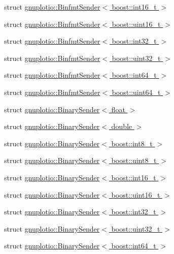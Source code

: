 \begin{DoxyCompactItemize}
struct \hyperlink{structgnuplotio_1_1_binfmt_sender_3_01boost_1_1int16__t_01_4}{gnuplotio\+::\+Binfmt\+Sender$<$ boost\+::int16\+\_\+t $>$}
\item 
struct \hyperlink{structgnuplotio_1_1_binfmt_sender_3_01boost_1_1uint16__t_01_4}{gnuplotio\+::\+Binfmt\+Sender$<$ boost\+::uint16\+\_\+t $>$}
\item 
struct \hyperlink{structgnuplotio_1_1_binfmt_sender_3_01boost_1_1int32__t_01_4}{gnuplotio\+::\+Binfmt\+Sender$<$ boost\+::int32\+\_\+t $>$}
\item 
struct \hyperlink{structgnuplotio_1_1_binfmt_sender_3_01boost_1_1uint32__t_01_4}{gnuplotio\+::\+Binfmt\+Sender$<$ boost\+::uint32\+\_\+t $>$}
\item 
struct \hyperlink{structgnuplotio_1_1_binfmt_sender_3_01boost_1_1int64__t_01_4}{gnuplotio\+::\+Binfmt\+Sender$<$ boost\+::int64\+\_\+t $>$}
\item 
struct \hyperlink{structgnuplotio_1_1_binfmt_sender_3_01boost_1_1uint64__t_01_4}{gnuplotio\+::\+Binfmt\+Sender$<$ boost\+::uint64\+\_\+t $>$}
\item 
struct \hyperlink{structgnuplotio_1_1_binary_sender_3_01float_01_4}{gnuplotio\+::\+Binary\+Sender$<$ float $>$}
\item 
struct \hyperlink{structgnuplotio_1_1_binary_sender_3_01double_01_4}{gnuplotio\+::\+Binary\+Sender$<$ double $>$}
\item 
struct \hyperlink{structgnuplotio_1_1_binary_sender_3_01boost_1_1int8__t_01_4}{gnuplotio\+::\+Binary\+Sender$<$ boost\+::int8\+\_\+t $>$}
\item 
struct \hyperlink{structgnuplotio_1_1_binary_sender_3_01boost_1_1uint8__t_01_4}{gnuplotio\+::\+Binary\+Sender$<$ boost\+::uint8\+\_\+t $>$}
\item 
struct \hyperlink{structgnuplotio_1_1_binary_sender_3_01boost_1_1int16__t_01_4}{gnuplotio\+::\+Binary\+Sender$<$ boost\+::int16\+\_\+t $>$}
\item 
struct \hyperlink{structgnuplotio_1_1_binary_sender_3_01boost_1_1uint16__t_01_4}{gnuplotio\+::\+Binary\+Sender$<$ boost\+::uint16\+\_\+t $>$}
\item 
struct \hyperlink{structgnuplotio_1_1_binary_sender_3_01boost_1_1int32__t_01_4}{gnuplotio\+::\+Binary\+Sender$<$ boost\+::int32\+\_\+t $>$}
\item 
struct \hyperlink{structgnuplotio_1_1_binary_sender_3_01boost_1_1uint32__t_01_4}{gnuplotio\+::\+Binary\+Sender$<$ boost\+::uint32\+\_\+t $>$}
\item 
struct \hyperlink{structgnuplotio_1_1_binary_sender_3_01boost_1_1int64__t_01_4}{gnuplotio\+::\+Binary\+Sender$<$ boost\+::int64\+\_\+t $>$}

\end{DoxyCompactItemize}
